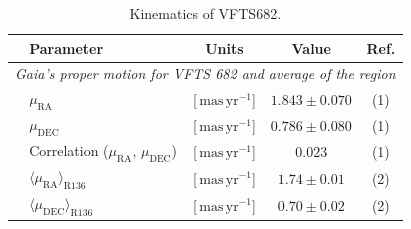 \documentclass[apjl,twocolumn]{emulateapj}
\newcommand{\masyr}{\,\mathrm{mas}\,\mathrm{yr}^{-1}}
\begin{document}
\begin{table}
  \begin{center}
    \caption{Kinematics of VFTS682. }
    \begin{tabular}{llc|c|c}
      \hline
      \hline
      &Parameter & Units & Value & Ref.\\
     
       \hline
           \multicolumn{5}{l}{\emph{Gaia's proper motion for VFTS 682 and average of the region}} \\
          &$\mu_\mathrm{RA}$&[$\masyr$] & $1.843\pm 0.070$
                     & (1) \\        
               &$\mu_\mathrm{DEC}$&[$\masyr$] & $0.786\pm 0.080$
                     &  (1) \\        
                 & Correlation  ($\mu_\mathrm{RA}$, $\mu_\mathrm{DEC}$) &[$\masyr$] & $0.023$
                        & (1)  \\         
       &$\langle\mu_\mathrm{RA}\rangle_\mathrm{R136}$&[$\masyr$] & $1.74\pm0.01$
                        & (2) \\
      &$\langle\mu_\mathrm{DEC}\rangle_\mathrm{R136}$&[$\masyr$]
                & $0.70\pm0.02$ &  (2)\\
\hline
      
                


\end{tabular}
\end{center}
\end{table}
\end{document}
